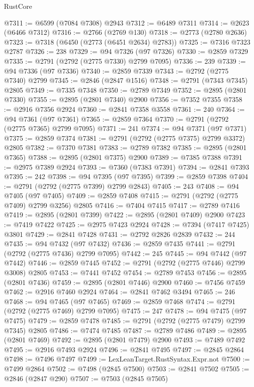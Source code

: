 \begin{lexlean}{RustCore}
\begin{coremodule}
@7311 := @6599 (@7084 @7308) @2943
@7312 := @6489 @7311
@7314 := @2623 (@6466 @7312)
@7316 := @2766 (@2769 @130)
@7318 := @2773 (@2780 @2636)
@7323 := @7318 (@6450 (@2773 (@6451 @2634) @2783))
@7325 := @7316 @7323 @2787
@7326 := 238
@7329 := @94 @7326 (@97 @7326)
@7330 := @2859 @7329
@7335 := @2791 (@2792 (@2775 @7330) @2799 @7095)
@7336 := 239
@7339 := @94 @7336 (@97 @7336)
@7340 := @2859 @7339
@7343 := @2792 (@2775 @7340) @2799
@7345 := @2846 (@2847 @1516)
@7348 := @2791 (@7343 @7345) @2805
@7349 := @7335 @7348
@7350 := @2789 @7349
@7352 := @2895 (@2801 @7330)
@7355 := @2895 (@2801 @7340) @2900
@7356 := @7352 @7355
@7358 := @2916 @7356 @2924
@7360 := @2841 @7358 @3558
@7361 := 240
@7364 := @94 @7361 (@97 @7361)
@7365 := @2859 @7364
@7370 := @2791 (@2792 (@2775 @7365) @2799 @7095)
@7371 := 241
@7374 := @94 @7371 (@97 @7371)
@7375 := @2859 @7374
@7381 := @2791 (@2792 (@2775 @7375) @2799 @3372) @2805
@7382 := @7370 @7381
@7383 := @2789 @7382
@7385 := @2895 (@2801 @7365)
@7388 := @2895 (@2801 @7375) @2900
@7389 := @7385 @7388
@7391 := @2975 @7389 @2924
@7393 := @7360 (@7383 @7391)
@7394 := @2841 @7393
@7395 := 242
@7398 := @94 @7395 (@97 @7395)
@7399 := @2859 @7398
@7404 := @2791 (@2792 (@2775 @7399) @2799 @2843)
@7405 := 243
@7408 := @94 @7405 (@97 @7405)
@7409 := @2859 @7408
@7415 := @2791 (@2792 (@2775 @7409) @2799 @3256) @2805
@7416 := @7404 @7415
@7417 := @2789 @7416
@7419 := @2895 (@2801 @7399)
@7422 := @2895 (@2801 @7409) @2900
@7423 := @7419 @7422
@7425 := @2975 @7423 @2924
@7428 := @7394 (@7417 @7425) @3801
@7429 := @2841 @7428
@7431 := @2792 @2826 @2839
@7432 := 244
@7435 := @94 @7432 (@97 @7432)
@7436 := @2859 @7435
@7441 := @2791 (@2792 (@2775 @7436) @2799 @7095)
@7442 := 245
@7445 := @94 @7442 (@97 @7442)
@7446 := @2859 @7445
@7452 := @2791 (@2792 (@2775 @7446) @2799 @3008) @2805
@7453 := @7441 @7452
@7454 := @2789 @7453
@7456 := @2895 (@2801 @7436)
@7459 := @2895 (@2801 @7446) @2900
@7460 := @7456 @7459
@7462 := @2916 @7460 @2924
@7464 := @2841 @7462 @3494
@7465 := 246
@7468 := @94 @7465 (@97 @7465)
@7469 := @2859 @7468
@7474 := @2791 (@2792 (@2775 @7469) @2799 @7095)
@7475 := 247
@7478 := @94 @7475 (@97 @7475)
@7479 := @2859 @7478
@7485 := @2791 (@2792 (@2775 @7479) @2799 @7345) @2805
@7486 := @7474 @7485
@7487 := @2789 @7486
@7489 := @2895 (@2801 @7469)
@7492 := @2895 (@2801 @7479) @2900
@7493 := @7489 @7492
@7495 := @2916 @7493 @2924
@7496 := @2841 @7495
@7497 := @2845 @2864
@7498 := @7496 @7497
@7499 := LexLeanTarget.RustSyntax.Expr.not
@7500 := @7499 @2864
@7502 := @7498 (@2845 @7500)
@7503 := @2841 @7502
@7505 := @2846 (@2847 @290)
@7507 := @7503 (@2845 @7505)

\end{coremodule}
\end{lexlean}
